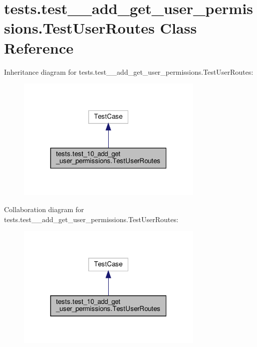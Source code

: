 \hypertarget{classtests_1_1test__10__add__get__user__permissions_1_1_test_user_routes}{}\section{tests.\+test\+\_\+\_\+add\+\_\+get\+\_\+user\+\_\+permissions.\+Test\+User\+Routes Class Reference}
\label{classtests_1_1test__10__add__get__user__permissions_1_1_test_user_routes}


Inheritance diagram for tests.\+test\+\_\+\_\+add\+\_\+get\+\_\+user\+\_\+permissions.\+Test\+User\+Routes\+:\nopagebreak
\begin{figure}[H]
\begin{center}
\leavevmode
\includegraphics[width=253pt]{classtests_1_1test__10__add__get__user__permissions_1_1_test_user_routes__inherit__graph}
\end{center}
\end{figure}


Collaboration diagram for tests.\+test\+\_\+\_\+add\+\_\+get\+\_\+user\+\_\+permissions.\+Test\+User\+Routes\+:\nopagebreak
\begin{figure}[H]
\begin{center}
\leavevmode
\includegraphics[width=253pt]{classtests_1_1test__10__add__get__user__permissions_1_1_test_user_routes__coll__graph}
\end{center}
\end{figure}
